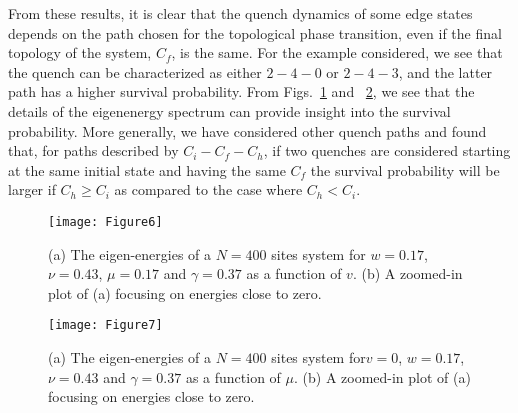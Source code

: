 \documentclass[aps,pra,reprint,superscriptaddress,longbibliography]{revtex4-2}
\begin{document}
From these results, it is clear that the quench dynamics of some edge states depends on the path chosen for the topological phase transition, even if the final topology of the system, $C_f$, is the same. For the example considered, we see that the quench can be characterized as either $ 2-4-0 $ or $ 2 -4 - 3 $, and the latter path has a higher survival probability. From Figs.~\ref{fig:figure6} and ~\ref{fig:figure7}, we see that the details of the eigenenergy spectrum can provide insight into the survival probability. More generally, we have considered other quench paths and found that, for paths described by $C_i-C_f-C_h$, if two quenches are considered starting at the same initial state and having the same $C_f$ the survival probability will be larger if $C_h \ge C_i$ as compared to the case where $C_h < C_i$.

\begin{figure}
	\centering
	\texttt{[image: Figure6]}
	\caption{(a) The eigen-energies of a $N=400$ sites system for $w=0.17$, $\nu=0.43$, $\mu=0.17$ and $\gamma=0.37$ as a function of $v$. (b) A zoomed-in plot of (a) focusing on energies close to zero.}
	\label{fig:figure6}
	\vspace{-0.5cm}
\end{figure}


\begin{figure}
	\centering
	\texttt{[image: Figure7]}
	\caption{(a) The eigen-energies of a $N=400$ sites system for$v=0$, $w=0.17$, $\nu=0.43$ and $\gamma=0.37$ as a function of $\mu$. (b) A zoomed-in plot of (a) focusing on energies close to zero.}
	\label{fig:figure7}
	\vspace{-0.5cm}
\end{figure}
\end{document}
